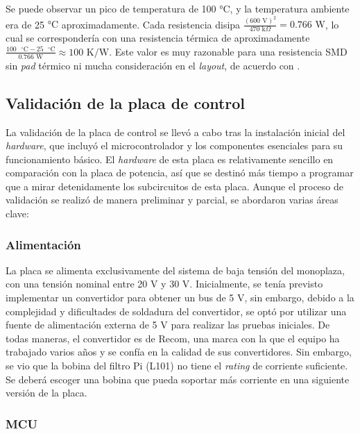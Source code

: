 Se puede observar un pico de temperatura de 100 $\si{\degreeCelsius}$, y la temperatura ambiente era de 25 $\si{\degreeCelsius}$ aproximadamente. Cada resistencia disipa $\frac{(600 \text{ V})^2}{470 \text{ k}\Omega} = 0.766 \text{ W}$, lo cual se correspondería con una resistencia térmica de aproximadamente $ \frac{100 \text{ }^{\circ}\text{C} - 25 \text{ }^{\circ}\text{C}}{0.766 \text{ W}} \approx 100 \text{ K/W}$. Este valor es muy razonable para una resistencia SMD sin \textit{pad} térmico ni mucha consideración en el \textit{layout}, de acuerdo con \cite{vishay_application_note}.

\subsection{Validación de la placa de control}

La validación de la placa de control se llevó a cabo tras la instalación inicial del \textit{hardware}, que incluyó el microcontrolador y los componentes esenciales para su funcionamiento básico. El \textit{hardware} de esta placa es relativamente sencillo en comparación con la placa de potencia, así que se destinó más tiempo a programar que a mirar detenidamente los subcircuitos de esta placa. Aunque el proceso de validación se realizó de manera preliminar y parcial, se abordaron varias áreas clave:

\subsubsection{Alimentación}

La placa se alimenta exclusivamente del sistema de baja tensión del monoplaza, con una tensión nominal entre 20 V y 30 V. Inicialmente, se tenía previsto implementar un convertidor para obtener un bus de 5 V, sin embargo, debido a la complejidad y dificultades de soldadura del convertidor, se optó por utilizar una fuente de alimentación externa de 5 V para realizar las pruebas iniciales. De todas maneras, el convertidor es de Recom, una marca con la que el equipo ha trabajado varios años y se confía en la calidad de sus convertidores. Sin embargo, se vio que la bobina del filtro Pi (L101) no tiene el \textit{rating} de corriente suficiente. Se deberá escoger una bobina que pueda soportar más corriente en una siguiente versión de la placa.

\subsubsection{MCU}

